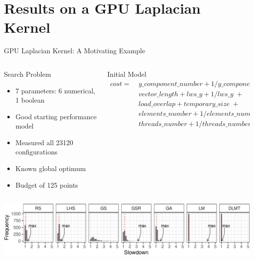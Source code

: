 \documentclass[10pt, compress, aspectratio=169, xcolor={table,usenames,dvipsnames}]{beamer}
\begin{document}
\section{Results on a GPU Laplacian Kernel}
\label{sec:orgecfeaf7}
\begin{frame}[label={sec:orga726d74}]{GPU Laplacian Kernel: A Motivating Example}
\begin{columns}
\begin{column}{0.5\columnwidth}
\begin{block}{Search Problem}
\begin{itemize}
\item 7 parameters: 6 \alert{numerical}, 1 \alert{boolean}
\item Good starting performance model
\item Measured all 23120 configurations
\item Known \alert{global optimum}
\item Budget of \alert{125 points}
\end{itemize}
\end{block}
\end{column}

\begin{column}{0.5\columnwidth}
\begin{block}{Initial Model}
\footnotesize
\begin{align*}
cost = & \; y\_component\_number + 1 / y\_component\_number \; + \\
& \; vector\_length + lws\_y + 1 / lws\_y \; + \\
& \; load\_overlap + temporary\_size \; + \\
& \; elements\_number + 1 / elements\_number \; + \\
& \; threads\_number + 1 / threads\_number
\end{align*}
\normalsize
\end{block}
\end{column}
\end{columns}

\vspace{-.3cm}


\vspace{-.3cm}

\begin{center}
\begin{center}
\includegraphics[width=\columnwidth]{../../../img/comparison_histogram.pdf}
\end{center}
\end{center}
\end{frame}
\end{document}
